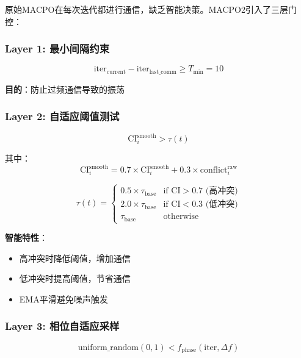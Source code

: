 \documentclass[15pt,a3paper]{ctexart}
\begin{document}
原始MACPO在每次迭代都进行通信，缺乏智能决策。MACPO2引入了三层门控：

\subsubsection{Layer 1: 最小间隔约束}

\begin{equation}
\text{iter}_{\text{current}} - \text{iter}_{\text{last\_comm}} \geq T_{\min} = 10
\end{equation}

\textbf{目的}：防止过频通信导致的振荡

\subsubsection{Layer 2: 自适应阈值测试}

\begin{equation}
\text{CI}_i^{\text{smooth}} > \tau(t)
\end{equation}

其中：
\begin{equation}
\text{CI}_i^{\text{smooth}} = 0.7 \times \text{CI}_i^{\text{smooth}} + 0.3 \times \text{conflict}_i^{\text{raw}}
\end{equation}

\begin{equation}
\tau(t) = \begin{cases}
0.5 \times \tau_{\text{base}} & \text{if } \text{CI} > 0.7 \text{ (高冲突)} \\
2.0 \times \tau_{\text{base}} & \text{if } \text{CI} < 0.3 \text{ (低冲突)} \\
\tau_{\text{base}} & \text{otherwise}
\end{cases}
\end{equation}

\textbf{智能特性}：
\begin{itemize}
    \item 高冲突时降低阈值，增加通信
    \item 低冲突时提高阈值，节省通信
    \item EMA平滑避免噪声触发
\end{itemize}

\subsubsection{Layer 3: 相位自适应采样}

\begin{equation}
\text{uniform\_random}(0,1) < f_{\text{phase}}(\text{iter}, \Delta f)
\end{equation}
\end{document}
